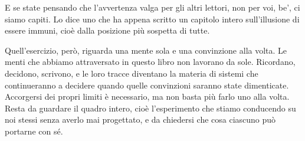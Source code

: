 E se state pensando che l'avvertenza valga per gli altri lettori, non per voi, be', ci siamo capiti. Lo dice uno che ha appena scritto un capitolo intero sull'illusione di essere immuni, cioè dalla posizione più sospetta di tutte.

Quell'esercizio, però, riguarda una mente sola e una convinzione alla volta. Le menti che abbiamo attraversato in questo libro non lavorano da sole. Ricordano, decidono, scrivono, e le loro tracce diventano la materia di sistemi che continueranno a decidere quando quelle convinzioni saranno state dimenticate. Accorgersi dei propri limiti è necessario, ma non basta più farlo uno alla volta. Resta da guardare il quadro intero, cioè l'esperimento che stiamo conducendo su noi stessi senza averlo mai progettato, e da chiedersi che cosa ciascuno può portarne con sé.
